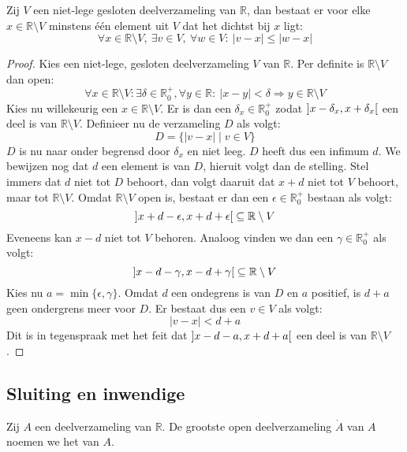\documentclass[main.tex]{subfiles}
\begin{document}
\begin{pr}
  Zij $V$ een niet-lege gesloten deelverzameling van $\mathbb{R}$, dan bestaat er voor elke $x\in \mathbb{R} \setminus V$ minstens \'e\'en element uit $V$ dat het dichtst bij $x$ ligt:
  \[ \forall x \in \mathbb{R}\setminus V,\ \exists v \in V,\ \forall w\in V:\ |v-x| \le |w-x| \]

  \begin{proof}
    Kies een niet-lege, gesloten deelverzameling $V$ van $\mathbb{R}$.
    Per definite is $\mathbb{R} \setminus V$ dan open:
    \[ \forall x\in \mathbb{R} \setminus V: \exists \delta \in \mathbb{R}_{0}^{+}, \forall y\in \mathbb{R}:\ |x-y| < \delta \Rightarrow y \in \mathbb{R}\setminus V \]
    Kies nu willekeurig een $x\in \mathbb{R}\setminus V$.
    Er is dan een $\delta_{x}\in \mathbb{R}_{0}^{+}$ zodat $\interval[open]{x-\delta_{x}}{x+\delta_{x}}$ een deel is van $\mathbb{R}\setminus V$.
    Definieer nu de verzameling $D$ als volgt:
    \[ D = \{ |v-x| \mid v \in V \} \]
    $D$ is nu naar onder begrensd door $\delta_{x}$ en niet leeg.
    $D$ heeft dus een infimum $d$. 
    We bewijzen nog dat $d$ een element is van $D$, hieruit volgt dan de stelling.
    Stel immers dat $d$ niet tot $D$ behoort, dan volgt daaruit dat $x+d$ niet tot $V$ behoort, maar tot $\mathbb{R} \setminus V$.
    Omdat $\mathbb{R} \setminus V$ open is, bestaat er dan een $\epsilon \in \mathbb{R}_{0}^{+}$ bestaan als volgt:
    \[ \interval[open]{x+d-\epsilon}{x+d+\epsilon} \subseteq \mathbb{R}\setminus V \]
    Eveneens kan $x-d$ niet tot $V$ behoren.
    Analoog vinden we dan een $\gamma\in \mathbb{R}_{0}^{+}$ als volgt:
    \[ \interval[open]{x-d-\gamma}{x-d+\gamma} \subseteq \mathbb{R}\setminus V \]
    Kies nu $a=\min\{\epsilon,\gamma\}$.
    Omdat $d$ een ondegrens is van $D$ en $a$ positief, is $d+a$ geen ondergrens meer voor $D$.
    Er bestaat dus een $v\in V$ als volgt:
    \[ |v-x| < d+a \]
    Dit is in tegenspraak met het feit dat $\interval[open]{x-d-a}{x+d+a}$ een deel is van $\mathbb{R}\setminus V$.
  \end{proof}
\feed
\end{pr}


\subsection{Sluiting en inwendige}
\label{sec:sluit-en-inwend}

\begin{de}
  Zij $A$ een deelverzameling van $\mathbb{R}$.
  De grootste open deelverzameling $\mathring{A}$ van $A$ noemen we het  van $A$.
\end{de}
\end{document}
